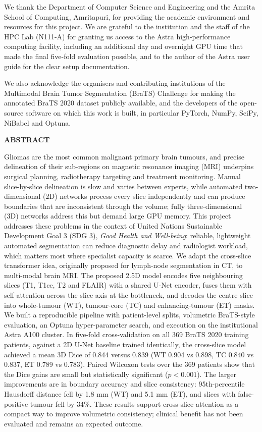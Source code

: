We thank the Department of Computer Science and Engineering and the Amrita School of Computing, Amritapuri, for providing the academic environment and resources for this project. We are grateful to the institution and the staff of the HPC Lab (N111-A) for granting us access to the Astra high-performance computing facility, including an additional day and overnight GPU time that made the final five-fold evaluation possible, and to the author of the Astra user guide for the clear setup documentation.

We also acknowledge the organisers and contributing institutions of the Multimodal Brain Tumor Segmentation (BraTS) Challenge for making the annotated BraTS 2020 dataset publicly available, and the developers of the open-source software on which this work is built, in particular PyTorch, NumPy, SciPy, NiBabel and Optuna.

\clearpage
{}
{}
{\centering \Large\bfseries ABSTRACT\par}
\vspace{0.4cm}
Gliomas are the most common malignant primary brain tumours, and precise delineation of their sub-regions on magnetic resonance imaging (MRI) underpins surgical planning, radiotherapy targeting and treatment monitoring. Manual slice-by-slice delineation is slow and varies between experts, while automated two-dimensional (2D) networks process every slice independently and can produce boundaries that are inconsistent through the volume; fully three-dimensional (3D) networks address this but demand large GPU memory. This project addresses these problems in the context of United Nations Sustainable Development Goal 3 (SDG 3), \emph{Good Health and Well-being}: reliable, lightweight automated segmentation can reduce diagnostic delay and radiologist workload, which matters most where specialist capacity is scarce. We adapt the cross-slice transformer idea, originally proposed for lymph-node segmentation in CT, to multi-modal brain MRI. The proposed 2.5D model encodes five neighbouring slices (T1, T1ce, T2 and FLAIR) with a shared U-Net encoder, fuses them with self-attention across the slice axis at the bottleneck, and decodes the centre slice into whole-tumour (WT), tumour-core (TC) and enhancing-tumour (ET) masks. We built a reproducible pipeline with patient-level splits, volumetric BraTS-style evaluation, an Optuna hyper-parameter search, and execution on the institutional Astra A100 cluster. In five-fold cross-validation on all 369 BraTS 2020 training patients, against a 2D U-Net baseline trained identically, the cross-slice model achieved a mean 3D Dice of 0.844 versus 0.839 (WT 0.904 vs 0.898, TC 0.840 vs 0.837, ET 0.789 vs 0.783). Paired Wilcoxon tests over the 369 patients show that the Dice gains are small but statistically significant ($p<0.001$). The larger improvements are in boundary accuracy and slice consistency: 95th-percentile Hausdorff distance fell by 1.8 mm (WT) and 5.1 mm (ET), and slices with false-positive tumour fell by 34\%. These results support cross-slice attention as a compact way to improve volumetric consistency; clinical benefit has not been evaluated and remains an expected outcome.

